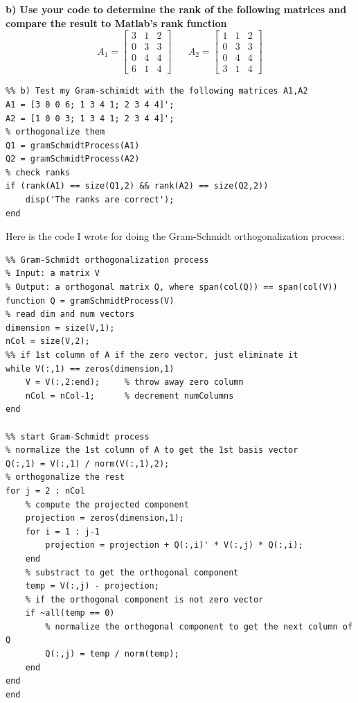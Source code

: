 \documentclass[paper=a4, fontsize=11pt]{scrartcl} %
\numberwithin{equation}{section} %
\numberwithin{figure}{section} %
\numberwithin{table}{section} %
\begin{document}
\textbf{b) Use your code to determine the rank of the following matrices and compare the result to Matlab’s rank function}\\
$$
A_1 = 
\begin{bmatrix}
3 & 1 & 2 \\
0 & 3 & 3 \\
0 & 4 & 4 \\
6 & 1 & 4 
\end{bmatrix}
\;\;\;\;\;\;
A_2 = 
\begin{bmatrix}
1 & 1 & 2 \\
0 & 3 & 3 \\
0 & 4 & 4 \\
3 & 1 & 4 
\end{bmatrix}
$$

\begin{lstlisting}
%% b) Test my Gram-schimidt with the following matrices A1,A2
A1 = [3 0 0 6; 1 3 4 1; 2 3 4 4]';
A2 = [1 0 0 3; 1 3 4 1; 2 3 4 4]';
% orthogonalize them
Q1 = gramSchmidtProcess(A1)
Q2 = gramSchmidtProcess(A2)
% check ranks 
if (rank(A1) == size(Q1,2) && rank(A2) == size(Q2,2))
    disp('The ranks are correct');
end
\end{lstlisting}


\newpage
Here is the code I wrote for doing the Gram-Schmidt orthogonalization process: 

\begin{lstlisting}
%% Gram-Schmidt orthogonalization process
% Input: a matrix V
% Output: a orthogonal matrix Q, where span(col(Q)) == span(col(V))
function Q = gramSchmidtProcess(V)
% read dim and num vectors
dimension = size(V,1);
nCol = size(V,2);
%% if 1st column of A if the zero vector, just eliminate it
while V(:,1) == zeros(dimension,1)
    V = V(:,2:end);     % throw away zero column
    nCol = nCol-1;      % decrement numColumns 
end

%% start Gram-Schmidt process
% normalize the 1st column of A to get the 1st basis vector
Q(:,1) = V(:,1) / norm(V(:,1),2);
% orthogonalize the rest
for j = 2 : nCol
    % compute the projected component
    projection = zeros(dimension,1);
    for i = 1 : j-1
        projection = projection + Q(:,i)' * V(:,j) * Q(:,i);
    end
    % substract to get the orthogonal component
    temp = V(:,j) - projection;
    % if the orthogonal component is not zero vector
    if ~all(temp == 0)
        % normalize the orthogonal component to get the next column of Q
        Q(:,j) = temp / norm(temp);
    end
end
end

\end{lstlisting}
\newpage
\end{document}
